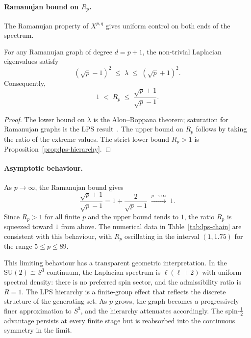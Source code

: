   \paragraph{Ramanujan bound on $R_p$.}
    The Ramanujan property of $X^{p,q}$ gives uniform control on both ends
    of the spectrum.

    \begin{proposition}
      \label{prop:ramanujan-R}
      For any Ramanujan graph of degree $d = p+1$, the non-trivial Laplacian
      eigenvalues satisfy
      \begin{equation}
        \left(\sqrt{p} - 1\right)^2 \;\leq\; \lambda \;\leq\; \left(\sqrt{p}+1\right)^2.
        \label{eq:ramanujan-window}
      \end{equation}
      Consequently,
      \begin{equation}
        1 \;<\; R_p \;\leq\; \frac{\sqrt{p}+1}{\sqrt{p}-1}.
        \label{eq:ramanujan-R-bound}
      \end{equation}
    \end{proposition}

    \begin{proof}
      The lower bound on $\lambda$ is the Alon--Boppana theorem; saturation for
      Ramanujan graphs is the LPS result~\cite{LPS1988}.
      The upper bound on $R_p$ follows by taking the ratio of the extreme values.
      The strict lower bound $R_p > 1$ is Proposition~\ref{prop:lps-hierarchy}.
    \end{proof}

  \paragraph{Asymptotic behaviour.}
    As $p \to \infty$, the Ramanujan bound gives
    \begin{equation}
      \frac{\sqrt{p}+1}{\sqrt{p}-1}
      = 1 + \frac{2}{\sqrt{p}-1}
      \;\xrightarrow{p\to\infty}\; 1.
      \label{eq:R-bound-limit}
    \end{equation}
    Since $R_p > 1$ for all finite $p$ and the upper bound tends to $1$, the
    ratio $R_p$ is squeezed toward $1$ from above.
    The numerical data in Table~\ref{tab:lps-chain} are consistent with this
    behaviour, with $R_p$ oscillating in the interval $(1, 1.75)$ for the range
    $5 \leq p \leq 89$.

    This limiting behaviour has a transparent geometric interpretation.
    In the $\mathrm{SU}(2) \cong S^3$ continuum, the Laplacian spectrum is
    $\ell(\ell+2)$ with uniform spectral density: there is no preferred spin
    sector, and the admissibility ratio is $R = 1$.
    The LPS hierarchy is a finite-group effect that reflects the discrete
    structure of the generating set.
    As $p$ grows, the graph becomes a progressively finer approximation to
    $S^3$, and the hierarchy attenuates accordingly.
    The spin-$\tfrac{1}{2}$ advantage persists at every finite stage but is
    reabsorbed into the continuous symmetry in the limit.

